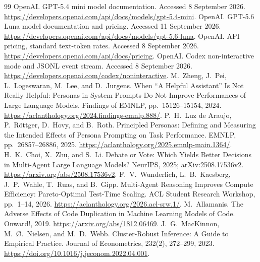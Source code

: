 \begin{thebibliography}{99}
 OpenAI. GPT-5.4 mini model documentation. Accessed 8 September 2026. \url{https://developers.openai.com/api/docs/models/gpt-5.4-mini}.
 OpenAI. GPT-5.6 Luna model documentation and pricing. Accessed 11 September 2026. \url{https://developers.openai.com/api/docs/models/gpt-5.6-luna}.
 OpenAI. API pricing, standard text-token rates. Accessed 8 September 2026. \url{https://developers.openai.com/api/docs/pricing}.
 OpenAI. Codex non-interactive mode and JSONL event stream. Accessed 8 September 2026. \url{https://developers.openai.com/codex/noninteractive}.
 M.~Zheng, J.~Pei, L.~Logeswaran, M.~Lee, and D.~Jurgens. When ``A Helpful Assistant'' Is Not Really Helpful: Personas in System Prompts Do Not Improve Performances of Large Language Models. Findings of EMNLP, pp.~15126--15154, 2024. \url{https://aclanthology.org/2024.findings-emnlp.888/}.
 P.~H.~Luz de Araujo, P.~R{\"o}ttger, D.~Hovy, and B.~Roth. Principled Personas: Defining and Measuring the Intended Effects of Persona Prompting on Task Performance. EMNLP, pp.~26857--26886, 2025. \url{https://aclanthology.org/2025.emnlp-main.1364/}.
 H.~K.~Choi, X.~Zhu, and S.~Li. Debate or Vote: Which Yields Better Decisions in Multi-Agent Large Language Models? NeurIPS, 2025; arXiv:2508.17536v2. \url{https://arxiv.org/abs/2508.17536v2}.
 F.~V.~Wunderlich, L.~B.~Kaesberg, J.~P.~Wahle, T.~Ruas, and B.~Gipp. Multi-Agent Reasoning Improves Compute Efficiency: Pareto-Optimal Test-Time Scaling. ACL Student Research Workshop, pp.~1--14, 2026. \url{https://aclanthology.org/2026.acl-srw.1/}.
 M.~Allamanis. The Adverse Effects of Code Duplication in Machine Learning Models of Code. Onward!, 2019. \url{https://arxiv.org/abs/1812.06469}.
 J.~G.~MacKinnon, M.~\O.~Nielsen, and M.~D.~Webb. Cluster-Robust Inference: A Guide to Empirical Practice. Journal of Econometrics, 232(2), 272--299, 2023. \url{https://doi.org/10.1016/j.jeconom.2022.04.001}.
\end{thebibliography}
